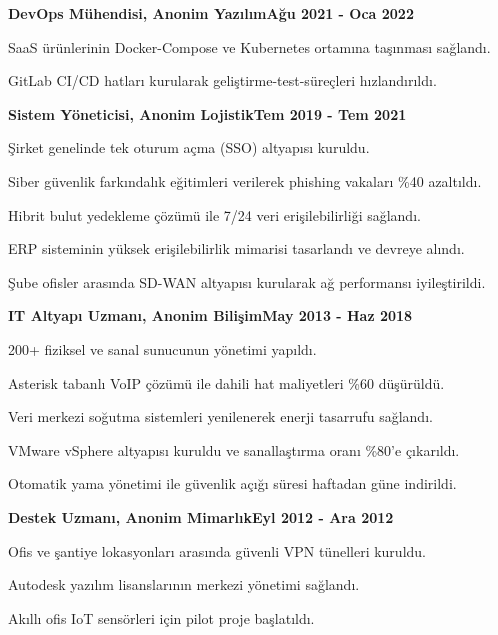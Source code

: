 \documentclass[a4paper,11pt]{article}
\newcommand{\heading}[2]{
  \hspace{10pt}#1\hfill#2\\
}
\newcommand{\headingBf}[2]{
  \heading{\textbf{#1}}{\textbf{#2}}
}
\newenvironment{resume_list}{
  \vspace{-7pt}
  \begin{itemize}[itemsep=-2px, parsep=1pt, leftmargin=30pt] 
}{
  \end{itemize}
}
\begin{document}
  \headingBf{DevOps Mühendisi, Anonim Yazılım}{Ağu 2021 - Oca 2022}
  \begin{resume_list}
    \item SaaS ürünlerinin Docker-Compose ve Kubernetes ortamına taşınması sağlandı.
    \item GitLab CI/CD hatları kurularak geliştirme-test-süreçleri hızlandırıldı.
  \end{resume_list}

  \headingBf{Sistem Yöneticisi, Anonim Lojistik}{Tem 2019 - Tem 2021}
  \begin{resume_list}
  \item Şirket genelinde tek oturum açma (SSO) altyapısı kuruldu.
  \item Siber güvenlik farkındalık eğitimleri verilerek phishing vakaları \%40 azaltıldı.
  \item Hibrit bulut yedekleme çözümü ile 7/24 veri erişilebilirliği sağlandı.
  \item ERP sisteminin yüksek erişilebilirlik mimarisi tasarlandı ve devreye alındı.
  \item Şube ofisler arasında SD-WAN altyapısı kurularak ağ performansı iyileştirildi.
  \end{resume_list}

  \headingBf{IT Altyapı Uzmanı, Anonim Bilişim}{May 2013 - Haz 2018}
  \begin{resume_list}
  \item 200+ fiziksel ve sanal sunucunun yönetimi yapıldı.
  \item Asterisk tabanlı VoIP çözümü ile dahili hat maliyetleri \%60 düşürüldü.
  \item Veri merkezi soğutma sistemleri yenilenerek enerji tasarrufu sağlandı.
  \item VMware vSphere altyapısı kuruldu ve sanallaştırma oranı \%80’e çıkarıldı.
  \item Otomatik yama yönetimi ile güvenlik açığı süresi haftadan güne indirildi.
  \end{resume_list}

  \headingBf{Destek Uzmanı, Anonim Mimarlık}{Eyl 2012 - Ara 2012}
  \begin{resume_list}
    \item Ofis ve şantiye lokasyonları arasında güvenli VPN tünelleri kuruldu.
    \item Autodesk yazılım lisanslarının merkezi yönetimi sağlandı.
    \item Akıllı ofis IoT sensörleri için pilot proje başlatıldı.
  \end{resume_list}
\end{document}
